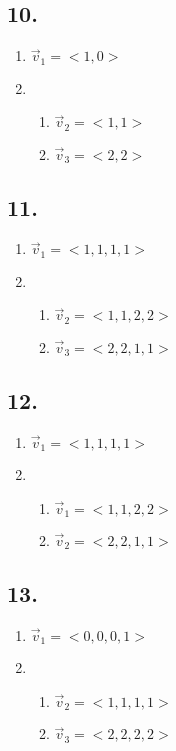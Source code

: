 \documentclass{article}
\begin{document}
\subsection{10.}
\begin{enumerate}[label=\textbf{\alph*.}]
	\item $ \vec{v}_1 = <1, 0> $
	\item
		\begin{enumerate}[label=\textbf{\arabic*.}]
			\item $ \vec{v}_2 = <1, 1> $
			\item $ \vec{v}_3 = <2, 2> $
		\end{enumerate}
\end{enumerate}

\subsection{11.}
\begin{enumerate}[label=\textbf{\alph*.}]
	\item $ \vec{v}_1 = <1, 1, 1, 1> $
	\item
		\begin{enumerate}[label=\textbf{\arabic*.}]
			\item $ \vec{v}_2 = <1, 1, 2, 2> $
			\item $ \vec{v}_3 = <2, 2, 1, 1> $
		\end{enumerate}
\end{enumerate}

\subsection{12.}
\begin{enumerate}[label=\textbf{\alph*.}]
	\item $ \vec{v}_1 = <1, 1, 1, 1> $
	\item
		\begin{enumerate}[label=\textbf{\arabic*.}]
			\item $ \vec{v}_1 = <1, 1, 2, 2> $
			\item $ \vec{v}_2 = <2, 2, 1, 1> $
		\end{enumerate}
\end{enumerate}

\subsection{13.}
\begin{enumerate}[label=\textbf{\alph*.}]
	\item $ \vec{v}_1 = <0, 0, 0, 1> $
	\item
		\begin{enumerate}[label=\textbf{\arabic*.}]
			\item $ \vec{v}_2 = <1, 1, 1, 1> $
			\item $ \vec{v}_3 = <2, 2, 2, 2> $
		\end{enumerate}
\end{enumerate}
\end{document}
